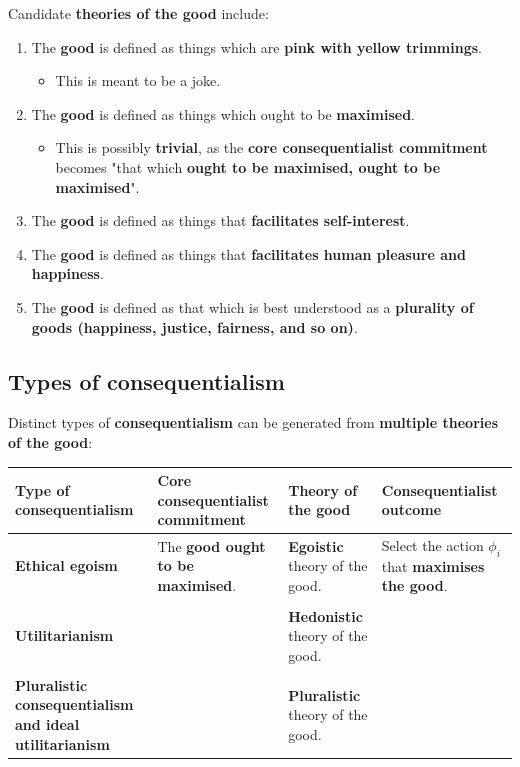 \documentclass[11pt]{article}
\begin{document}
Candidate \textbf{theories of the good} include:
\begin{enumerate}
\item The \textbf{good} is defined as things which are \textbf{pink with yellow trimmings}.
\begin{itemize}
\item This is meant to be a joke.
\end{itemize}
\item The \textbf{good} is defined as things which ought to be \textbf{maximised}.
\begin{itemize}
\item This is possibly \textbf{trivial}, as the \textbf{core consequentialist commitment} becomes "that which \textbf{ought to be maximised, ought to be maximised}".
\end{itemize}
\item The \textbf{good} is defined as things that \textbf{facilitates self-interest}.
\item The \textbf{good} is defined as things that \textbf{facilitates human pleasure and happiness}.
\item The \textbf{good} is defined as that which is best understood as a \textbf{plurality of goods (happiness, justice, fairness, and so on)}.
\end{enumerate}

 \newpage
\subsection{Types of consequentialism}
\label{sec:org2c59c99}
Distinct types of \textbf{consequentialism} can be generated from \textbf{multiple theories of the good}:
\begin{center}
\begin{tabularx}{\textwidth}{|X|X|X|X|}
\hline
Type of consequentialism & Core consequentialist commitment & Theory of the good & Consequentialist outcome\\
\hline
\textbf{Ethical egoism} & The \textbf{good ought to be maximised}. & \textbf{Egoistic} theory of the good. & Select the action \(\phi_i\) that \textbf{maximises the good}.\\
 &  &  & \\
\textbf{Utilitarianism} &  & \textbf{Hedonistic} theory of the good. & \\
 &  &  & \\
\textbf{Pluralistic consequentialism and ideal utilitarianism} &  & \textbf{Pluralistic} theory of the good. & \\
\hline
\end{tabularx}
\end{center}
\end{document}
